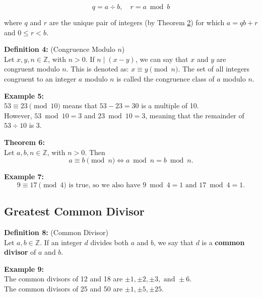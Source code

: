 \documentclass[12pt]{article}
\begin{document}
\[
q = a \div b, \quad r = a \bmod b
\]

where $q$ and $r$ are the unique pair of integers (by Theorem \hyperref[thm:division]{2}) for which $a = qb + r$ and $0 \leq r < b$.

\vspace{5mm}

\noindent\textbf{Definition 4:} (Congruence Modulo $n$)
\label{def:congruence}
\\Let $x,y,n \in \mathbb{Z}$, with $n > 0$. If $n \mid (x - y)$, we can say that $x$ and $y$ are congruent modulo $n$. 
This is denoted as: $x \equiv y \pmod{n}$.
The set of all integers congruent to an integer $a$ modulo $n$ is called the congruence class of $a$ modulo $n$.

\vspace{5mm}

\noindent\textbf{Example 5:} 
\label{ex:modexample}
\\ $53 \equiv 23 \pmod{10}$ means that $53-23=30$ is a multiple of 10. 
\\However, $53 \bmod 10 = 3$ and $23 \bmod 10 = 3$, meaning that the remainder of $53 \div 10$ is $3$.

\vspace{5mm}

\noindent\textbf{Theorem 6:} 
\label{thm:modiff}
\\Let $a,b,n \in \mathbb{Z}$, with $n > 0$. 
Then 
\[
a \equiv b \pmod{n} \iff a \bmod n = b \bmod n.
\]

\vspace{5mm}

\noindent\textbf{Example 7:}
\label{ex:modexample2}
\[
9 \equiv 17 \pmod{4} \text{ is true, so we also have } 
9\bmod 4 = 1 \text{ and } 17 \bmod 4 = 1.
\]

\vspace{15mm}

\subsection{Greatest Common Divisor}

\noindent\textbf{Definition 8:} (Common Divisor)
\label{def:commondivisor}
\\Let $a,b \in \mathbb{Z}$. If an integer $d$ divides both $a$ and $b$, we say that $d$ is a \textbf{common divisor} of $a$ and $b$.

\vspace{5mm}

\noindent\textbf{Example 9:}
\label{ex:commondvs}
\\The common divisors of 12 and 18 are $\pm1, \pm2, \pm3, \text{ and } \pm6$.
\\The common divisors of 25 and 50 are $\pm1, \pm5, \pm25$.
\end{document}
